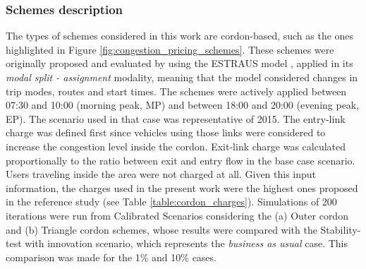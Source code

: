 \documentclass[Journal,letterpaper]{ascelike-new}
\begin{document}
\subsubsection{Schemes description}
The types of schemes considered in this work are cordon-based, such as the ones highlighted in Figure \ref{fig:congestion_pricing_schemes}. These schemes were originally proposed and evaluated by \cite{gleave2009tarificacion} using the ESTRAUS model \citep{ESTRAUS}, applied in its \emph{modal split - assignment} modality, meaning that the model considered changes in trip modes, routes and start times. The schemes were actively applied between 07:30 and 10:00 (morning peak, MP) and between 18:00 and 20:00 (evening peak, EP). The scenario used in that case was representative of 2015. The entry-link charge was defined first since vehicles using those links were considered to increase the congestion level inside the cordon. Exit-link charge was calculated proportionally to the ratio between exit and entry flow in the base case scenario. Users traveling inside the area were not charged at all. 
Given this input information, the charges used in the present work were the highest ones proposed in the reference study (see Table \ref{table:cordon_charges}). Simulations of 200 iterations were run from Calibrated Scenarios considering the (a) Outer cordon and (b) Triangle cordon schemes, whose results were compared with the Stability-test with innovation scenario, which represents the \emph{business as usual} case. This comparison was made for the 1\% and 10\% cases.
\end{document}
